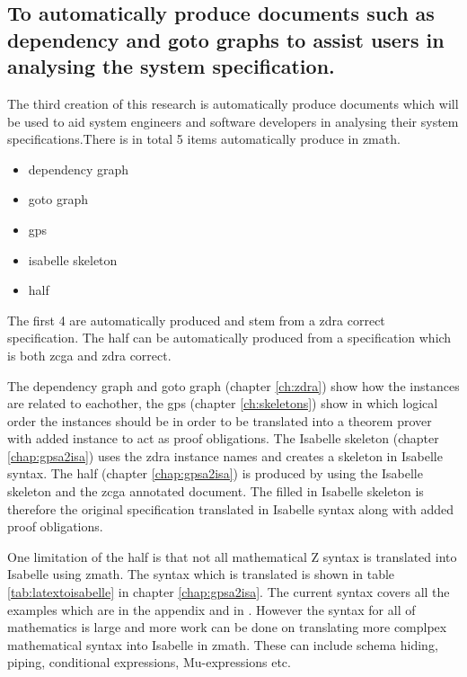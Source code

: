 \subsection{To automatically produce documents such as dependency and goto graphs to assist users in analysing the system specification.}

The third creation of this research is automatically produce documents which will be used to aid system engineers and software developers in analysing their system specifications.There is in total 5 items automatically produce in \gls{zmath}.

\begin{itemize}
\item dependency graph

\item goto graph

\item \gls{gps}

\item isabelle skeleton

\item \gls{half}
\end{itemize}

The first 4 are automatically produced and stem from a \gls{zdra} correct specification. The \gls{half} can be automatically produced from a specification which is both \gls{zcga} and \gls{zdra} correct.

The dependency graph and goto graph (chapter \ref{ch:zdra}) show how the instances are related to eachother, the \gls{gps} (chapter \ref{ch:skeletons}) show in which logical order the instances should be in order to be translated into a theorem prover with added instance to act as proof obligations. The Isabelle skeleton (chapter \ref{chap:gpsa2isa}) uses the \gls{zdra} instance names and creates a skeleton in Isabelle syntax. The \gls{half} (chapter \ref{chap:gpsa2isa}) is produced by using the Isabelle skeleton and the \gls{zcga} annotated document. The filled in Isabelle skeleton is therefore the original specification translated in Isabelle syntax along with added proof obligations.

One limitation of the \gls{half} is that not all mathematical Z syntax is translated into Isabelle using \gls{zmath}. The syntax which is translated is shown in table \ref{tab:latextoisabelle} in chapter \ref{chap:gpsa2isa}. The current syntax covers all the examples which are in the appendix and in \cite{mathlangexamples}. However the syntax for all of mathematics is large and more work can be done on translating more complpex mathematical syntax into Isabelle in \gls{zmath}. These can include schema hiding, piping, conditional expressions, Mu-expressions \cite{zrefcard} etc.

